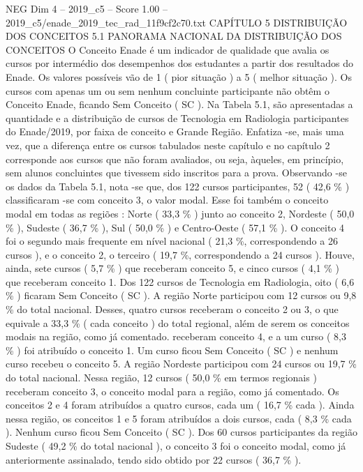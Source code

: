 \begin{textsample}{NEG Dim 4 – 2019\_c5 – Score 1.00 – 2019\_c5/enade\_2019\_tec\_rad\_11f9cf2c70.txt}  \label{ex:f4_neg_168}
CAPÍTULO 5 DISTRIBUIÇÃO DOS CONCEITOS 5.1 PANORAMA NACIONAL DA DISTRIBUIÇÃO DOS CONCEITOS O Conceito Enade é um indicador de qualidade que avalia os cursos por intermédio dos desempenhos dos estudantes a partir dos resultados do Enade.
Os valores possíveis vão de 1 ( pior situação ) a 5 ( melhor situação ).
Os cursos com apenas um ou sem nenhum concluinte participante não obtêm o Conceito Enade, ficando Sem Conceito ( SC ).
Na Tabela 5.1, são apresentadas a quantidade e a distribuição de cursos de Tecnologia em Radiologia participantes do Enade/2019, por faixa de conceito e Grande Região.
Enfatiza -se, mais uma vez, que a diferença entre os cursos tabulados neste capítulo e no capítulo 2 corresponde aos cursos que não foram avaliados, ou seja, àqueles, em princípio, sem alunos concluintes que tivessem sido inscritos para a prova.
Observando -se os dados da Tabela 5.1, nota -se que, dos 122 cursos participantes, 52 ( 42,6 \% ) classificaram -se com conceito 3, o valor modal.
Esse foi também o conceito modal em todas as regiões : Norte ( 33,3 \% ) junto ao conceito 2, Nordeste ( 50,0 \% ), Sudeste ( 36,7 \% ), Sul ( 50,0 \% ) e Centro-Oeste ( 57,1 \% ).
O conceito 4 foi o segundo mais frequente em nível nacional ( 21,3 \%, correspondendo a 26 cursos ), e o conceito 2, o terceiro ( 19,7 \%, correspondendo a 24 cursos ).
Houve, ainda, sete cursos ( 5,7 \% ) que receberam conceito 5, e cinco cursos ( 4,1 \% ) que receberam conceito 1.
Dos 122 cursos de Tecnologia em Radiologia, oito ( 6,6 \% ) ficaram Sem Conceito ( SC ).
A região Norte participou com 12 cursos ou 9,8 \% do total nacional.
Desses, quatro cursos receberam o conceito 2 ou 3, o que equivale a 33,3 \% ( cada conceito ) do total regional, além de serem os conceitos modais na região, como já comentado. receberam conceito 4, e a um curso ( 8,3 \% ) foi atribuído o conceito 1.
Um curso ficou Sem Conceito ( SC ) e nenhum curso recebeu o conceito 5.
A região Nordeste participou com 24 cursos ou 19,7 \% do total nacional.
Nessa região, 12 cursos ( 50,0 \% em termos regionais ) receberam conceito 3, o conceito modal para a região, como já comentado.
Os conceitos 2 e 4 foram atribuídos a quatro cursos, cada um ( 16,7 \% cada ).
Ainda nessa região, os conceitos 1 e 5 foram atribuídos a dois cursos, cada ( 8,3 \% cada ).
Nenhum curso ficou Sem Conceito ( SC ).
Dos 60 cursos participantes da região Sudeste ( 49,2 \% do total nacional ), o conceito 3 foi o conceito modal, como já anteriormente assinalado, tendo sido obtido por 22 cursos ( 36,7 \% ).

\end{textsample}
